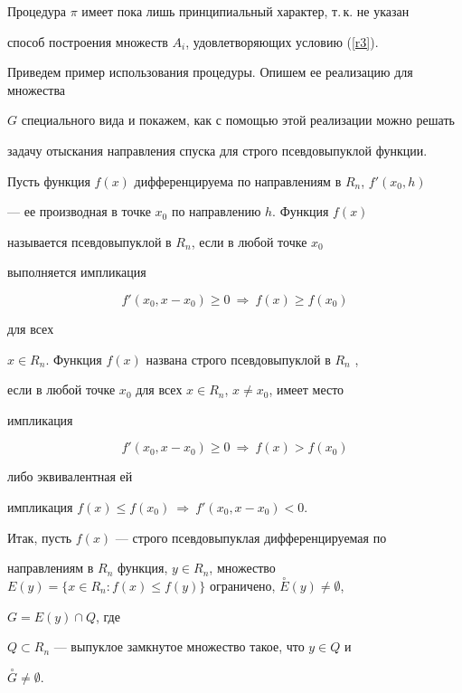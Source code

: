 Процедура $\pi$ имеет пока лишь принципиальный характер, т.\,к. не указан


способ построения множеств $A_i$, удовлетворяющих условию (\ref{r3}).


Приведем пример использования процедуры. Опишем ее реализацию для множества


$G$ специального вида и покажем, как с помощью этой реализации можно решать


задачу отыскания направления спуска для строго псевдовыпуклой функции.





Пусть функция $f(x)$ дифференцируема по направлениям в $R_n$, $f'(x_0,h)$


--- ее производная в точке $x_0$ по направлению $h$. Функция $f(x)$


называется \cite{b1} псевдовыпуклой в $R_n$, если в любой точке $x_0$


выполняется импликация


$$


f'(x_0,x-x_0)\ge 0 \ \Longrightarrow \ f(x)\ge f(x_0)


$$


для всех


$x\in R_n$. Функция $f(x)$ названа строго псевдовыпуклой в $R_n$ \cite{b1},


если в любой точке $x_0$ для всех $x\in R_n$, $x\ne x_0$, имеет место


импликация


$$


f'(x_0,x-x_0)\ge 0 \ \Longrightarrow \ f(x)> f(x_0)


$$


либо эквивалентная ей


импликация $f(x)\le f(x_0) \ \Longrightarrow \ f'(x_0,x-x_0)<0$.





Итак, пусть $f(x)$ --- строго псевдовыпуклая дифференцируемая по


направлениям в $R_n$ функция, $y\in R_n$, множество $E(y)=\{x\in R_n:


f(x)\le f(y)\}$ ограничено, $\overset{\circ}{E}{}(y)\ne \emptyset$,


$G=E(y)\cap Q$, где


$Q\subset R_n$ --- выпуклое замкнутое множество такое, что $y\in Q$ и


$\overset{\circ}{G}{} \ne \emptyset$.



